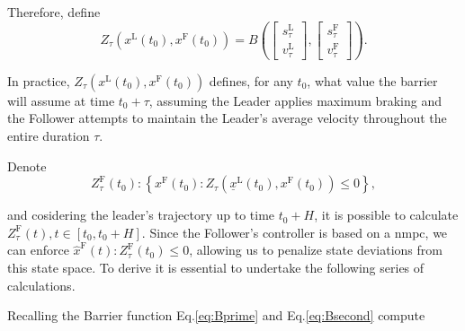 Therefore, define
%
\begin{equation}
	Z_{\tau}\left(x^\mathrm{L}\left(t_0\right),x^\mathrm{F}\left(t_0\right)\right)= B\left(\left[\begin{array}{l}
		s_{\tau}^\mathrm{L} \\
		v_{\tau}^\mathrm{L}
	\end{array}\right],\left[\begin{array}{l}
		s_{\tau}^\mathrm{F} \\
		v_{\tau}^\mathrm{F}
	\end{array}\right]\right).
\end{equation}
%

In practice, $Z_{\tau}\left(x^\mathrm{L}\left(t_0\right),x^\mathrm{F}\left(t_0\right)\right)$ defines, for any $t_0$, what value the barrier will assume at time $t_0+\tau$, assuming the Leader applies maximum braking and the Follower attempts to maintain the Leader's average velocity throughout the entire duration $\tau$.

Denote
%
\begin{equation}
	Z_{\tau}^\mathrm{F}\left(t_0\right) : \left\{ x^\mathrm{F}\left(t_0\right): Z_{\tau}\left(\underline{x}^\mathrm{L}\left(t_0\right),x^\mathrm{F}\left(t_0\right)\right) \leq 0 \right \},
\end{equation}
%

and cosidering the leader's trajectory up to time $t_0+H$, it is possible to calculate $Z_{\tau}^\mathrm{F}\left(t\right), t \in \left[t_0, t_0+H \right]$. Since the Follower's controller is based on a \gls{nmpc}, we can enforce $\hat{x}^\mathrm{F}\left(t\right) : Z_{\tau}^\mathrm{F}\left(t_0\right) \leq 0$, allowing us to penalize state deviations from this state space. To derive it is essential to undertake the following series of calculations.

Recalling the Barrier function Eq.\eqref{eq:Bprime} and  Eq.\eqref{eq:Bsecond} compute
%

